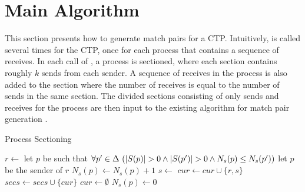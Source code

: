 \section{Main Algorithm}


This section presents how to generate match pairs for a CTP. 
Intuitively,  is called several times for the CTP, once for each process that contains a sequence of receives. 
In each call of , a process is sectioned, where each section contains roughly $k$ sends from each sender. A sequence of receives in the process is also added to the section where the number of receives is equal to the number of sends in the same section.
The divided sections consisting of only sends and receives for the process are then input to the existing algorithm for match pair generation \cite{DBLP:conf/kbse/HuangMM13}. 



\begin{algorithm}
\caption{Process Sectioning}\label{algo:main}
\begin{algorithmic}[1]
\State $r \gets$ 
\State let $p$ be such that $\forall p^\prime \in \Delta\ (|S(p)|>0  \wedge |S(p^\prime)|>0  \wedge \Call{$N_s$}{p}\le \Call{$N_s$}{p^\prime} )$
\Else 
\State let $p$ be the sender of $r$
\EndIf
\State $N_s(p)\gets N_s(p)+1$
\State $s\gets$ 
\State $\mathit{cur}\gets \mathit{cur}\cup \{r,s\}$
\State $\mathit{secs}\gets\mathit{secs}\cup\{\mathit{cur}\}$
\State $\mathit{cur}\gets\emptyset$
\State $N_s(p)\gets 0$
\EndFor
\EndIf
\EndWhile
\end{algorithmic}
\end{algorithm}



